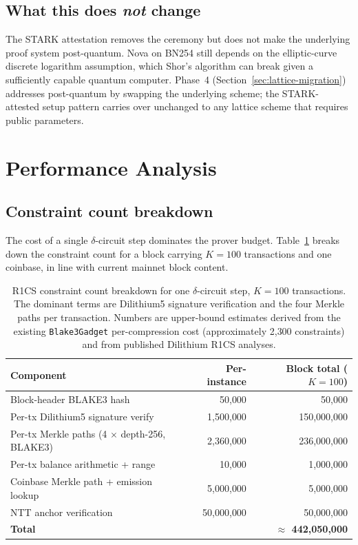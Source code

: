 \documentclass[11pt,a4paper]{article}
\begin{document}
\subsection{What this does \emph{not} change}

The STARK attestation removes the ceremony but does not make the underlying
proof system post-quantum. Nova on BN254 still depends on the elliptic-curve
discrete logarithm assumption, which Shor's algorithm \cite{Shor1994} can
break given a sufficiently capable quantum computer. Phase~4
(Section~\ref{sec:lattice-migration}) addresses post-quantum by swapping the
underlying scheme; the STARK-attested setup pattern carries over unchanged
to any lattice scheme that requires public parameters.

\section{Performance Analysis}
\label{sec:performance}

\subsection{Constraint count breakdown}

The cost of a single $\delta$-circuit step dominates the prover budget.
Table~\ref{tab:constraints} breaks down the constraint count for a
block carrying $K = 100$ transactions and one coinbase, in line with
current mainnet block content.

\begin{table}[h]
\centering
\begin{tabular}{lrr}
\toprule
\textbf{Component} & \textbf{Per-instance} & \textbf{Block total ($K=100$)} \\
\midrule
Block-header BLAKE3 hash               & 50{,}000        & 50{,}000 \\
Per-tx Dilithium5 signature verify     & 1{,}500{,}000   & 150{,}000{,}000 \\
Per-tx Merkle paths (4 $\times$ depth-256, BLAKE3) & 2{,}360{,}000 & 236{,}000{,}000 \\
Per-tx balance arithmetic + range      & 10{,}000        & 1{,}000{,}000 \\
Coinbase Merkle path + emission lookup & 5{,}000{,}000   & 5{,}000{,}000 \\
NTT anchor verification                & 50{,}000{,}000  & 50{,}000{,}000 \\
\midrule
\textbf{Total}                         &                 & \textbf{$\approx$ 442{,}050{,}000} \\
\bottomrule
\end{tabular}
\caption{R1CS constraint count breakdown for one $\delta$-circuit step, $K = 100$ transactions.
The dominant terms are Dilithium5 signature verification and the four Merkle paths per
transaction. Numbers are upper-bound estimates derived from the existing
\texttt{Blake3Gadget} per-compression cost (approximately 2{,}300 constraints)
and from published Dilithium R1CS analyses.}
\label{tab:constraints}
\end{table}
\end{document}
